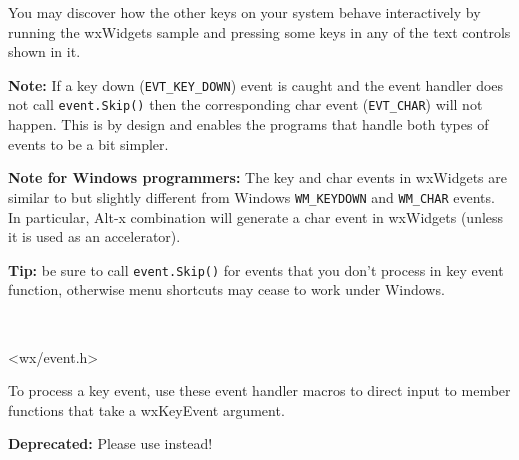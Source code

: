 You may discover how the other keys on your system behave interactively by
running the  wxWidgets sample and pressing some keys
in any of the text controls shown in it.

{\bf Note:} If a key down ({\tt EVT\_KEY\_DOWN}) event is caught and
the event handler does not call {\tt event.Skip()} then the corresponding
char event ({\tt EVT\_CHAR}) will not happen.  This is by design and
enables the programs that handle both types of events to be a bit
simpler.

{\bf Note for Windows programmers:} The key and char events in wxWidgets are
similar to but slightly different from Windows {\tt WM\_KEYDOWN} and
{\tt WM\_CHAR} events. In particular, Alt-x combination will generate a char
event in wxWidgets (unless it is used as an accelerator).

{\bf Tip:} be sure to call {\tt event.Skip()} for events that you don't process in
key event function, otherwise menu shortcuts may cease to work under Windows.


\\


<wx/event.h>




To process a key event, use these event handler macros to direct input to member
functions that take a wxKeyEvent argument.

\twocolwidtha{7cm}
\begin{twocollist}\itemsep=0pt
\end{twocollist}%




\label{wxkeyeventmaltdown}


\textbf{Deprecated: } Please use 
instead!

